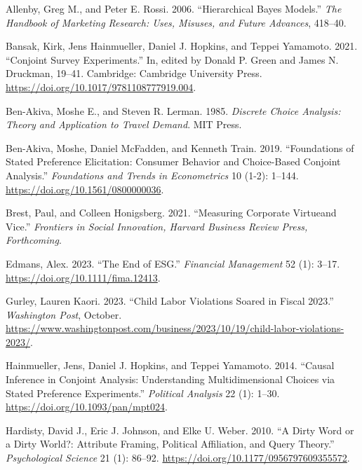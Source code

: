 \documentclass[
  12pt,
]{article}
\newlength{\cslhangindent}
\newlength{\cslentryspacingunit} %
\newenvironment{CSLReferences}[2] %
 {%
  \setlength{\parindent}{0pt}
  \ifodd #1
  \let\oldpar\par
  \def\par{\hangindent=\cslhangindent\oldpar}
  \fi
  \setlength{\parskip}{#2\cslentryspacingunit}
 }%
 {}
\begin{document}
\hypertarget{refs}{}
\begin{CSLReferences}{1}{0}
\leavevmode{}%
Allenby, Greg M., and Peter E. Rossi. 2006. {``Hierarchical Bayes Models.''} \emph{The Handbook of Marketing Research: Uses, Misuses, and Future Advances}, 418--40.

\leavevmode{}%
Bansak, Kirk, Jens Hainmueller, Daniel J. Hopkins, and Teppei Yamamoto. 2021. {``Conjoint Survey Experiments.''} In, edited by Donald P. Green and James N. Druckman, 19--41. Cambridge: Cambridge University Press. \url{https://doi.org/10.1017/9781108777919.004}.

\leavevmode{}%
Ben-Akiva, Moshe E., and Steven R. Lerman. 1985. \emph{Discrete Choice Analysis: Theory and Application to Travel Demand}. MIT Press.

\leavevmode{}%
Ben-Akiva, Moshe, Daniel McFadden, and Kenneth Train. 2019. {``Foundations of Stated Preference Elicitation: Consumer Behavior and Choice-Based Conjoint Analysis.''} \emph{Foundations and Trends in Econometrics} 10 (1-2): 1--144. \url{https://doi.org/10.1561/0800000036}.

\leavevmode{}%
Brest, Paul, and Colleen Honigsberg. 2021. {``Measuring Corporate Virtue{\textemdash}and Vice.''} \emph{Frontiers in Social Innovation, Harvard Business Review Press, Forthcoming}.

\leavevmode{}%
Edmans, Alex. 2023. {``The End of ESG.''} \emph{Financial Management} 52 (1): 3--17. \url{https://doi.org/10.1111/fima.12413}.

\leavevmode{}%
Gurley, Lauren Kaori. 2023. {``Child Labor Violations Soared in Fiscal 2023.''} \emph{Washington Post}, October. \url{https://www.washingtonpost.com/business/2023/10/19/child-labor-violations-2023/}.

\leavevmode{}%
Hainmueller, Jens, Daniel J. Hopkins, and Teppei Yamamoto. 2014. {``Causal Inference in Conjoint Analysis: Understanding Multidimensional Choices via Stated Preference Experiments.''} \emph{Political Analysis} 22 (1): 1--30. \url{https://doi.org/10.1093/pan/mpt024}.

\leavevmode{}%
Hardisty, David J., Eric J. Johnson, and Elke U. Weber. 2010. {``A Dirty Word or a Dirty World?: Attribute Framing, Political Affiliation, and Query Theory.''} \emph{Psychological Science} 21 (1): 86--92. \url{https://doi.org/10.1177/0956797609355572}.


\end{CSLReferences}
\end{document}

